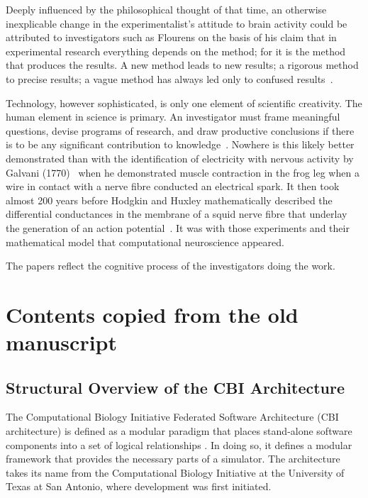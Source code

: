 \documentclass{article}
\begin{document}
Deeply influenced by the philosophical thought of that time, an otherwise inexplicable change in the experimentalist's attitude to brain activity could be attributed to investigators such as Flourens on the basis of his claim that in experimental research everything depends on the method; for it is the method that produces the results. A new method leads to new results; a rigorous method to precise results; a vague method has always led only to confused results~\cite{flourens24}.

Technology, however sophisticated, is only one element of scientific creativity. The human element in science is primary. An investigator must frame meaningful questions, devise programs of research, and draw productive conclusions if there is to be any significant contribution to knowledge~\cite{clarke87}. Nowhere is this likely better demonstrated than with the identification of electricity with nervous activity by Galvani (1770)~\cite{galvani91} when he demonstrated muscle contraction in the frog leg when a wire in contact with a nerve fibre conducted an electrical spark. It then took almost 200 years before Hodgkin and Huxley mathematically described the differential conductances in the membrane of a squid nerve fibre that underlay the generation of an action potential~\cite{hodgkin52e}. It was with those experiments and their mathematical model that computational neuroscience appeared.

The papers reflect the cognitive process of the investigators doing the work.


\section{Contents copied from the old manuscript}

\subsection{Structural Overview of the CBI Architecture}

The Computational Biology Initiative Federated Software Architecture (CBI architecture) is defined as a modular paradigm that places
stand-alone software components into a set of logical relationships \cite{10.1371/journal.pone.0028956}.
In doing so, it defines a modular framework that provides the
necessary parts of a simulator. The architecture takes its name from the Computational Biology Initiative at the University of Texas at San Antonio, where development was first initiated.
\end{document}
